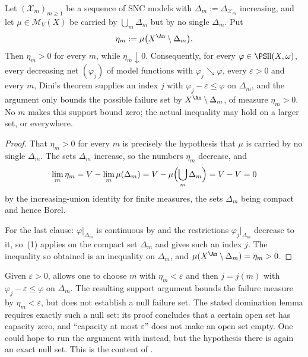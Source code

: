 \begin{proposition}
\label{prop:ch29-one-complex}
Let $(\mathcal X_m)_{m\geq1}$ be a sequence of SNC models with
$\Delta_m:=\Delta_{\mathcal X_m}$ increasing, and let
$\mu\in\mathcal M_V(X)$ be carried by
$\bigcup_m\Delta_m$ but by no single $\Delta_m$.  Put
\[
 \eta_m:=\mu\bigl(X^{\An}\setminus\Delta_m\bigr).
\]
Then $\eta_m>0$ for every $m$, while $\eta_m\downarrow0$.
Consequently, for every $\varphi\in\PSH(X,\omega)$, every decreasing net
$(\varphi_j)$ of model functions with $\varphi_j\searrow\varphi$, every
$\varepsilon>0$ and every $m$, Dini's theorem supplies an index
$j$ with $\varphi_j-\varepsilon\leq\varphi$ on $\Delta_m$, and the
argument only bounds the possible failure set by
$X^{\An}\setminus\Delta_m$, of measure $\eta_m>0$.
No $m$ makes this support bound zero; the actual inequality may hold
on a larger set, or everywhere.
\end{proposition}

\begin{proof}
That $\eta_m>0$ for every $m$ is precisely the hypothesis that $\mu$
is carried by no single $\Delta_m$.  The sets $\Delta_m$ increase, so
the numbers $\eta_m$ decrease, and
\[
 \lim_m\eta_m=V-\lim_m\mu(\Delta_m)
  =V-\mu\Bigl(\bigcup_m\Delta_m\Bigr)=V-V=0
\]
by the increasing-union identity for finite measures, the sets
$\Delta_m$ being compact and hence Borel.

For the last clause: $\varphi|_{\Delta_m}$ is continuous by
 and the restrictions
$\varphi_j|_{\Delta_m}$ decrease to it, so
\,(1) applies on the compact set $\Delta_m$ and gives
such an index $j$.  The inequality so obtained is an inequality on
$\Delta_m$, and $\mu(X^{\An}\setminus\Delta_m)=\eta_m>0$.
\end{proof}

\begin{remark}
\label{rem:ch29-no-diagonal}
Given $\varepsilon>0$,  allows one to choose
$m$ with $\eta_m<\varepsilon$ and then $j=j(m)$ with
$\varphi_j-\varepsilon\leq\varphi$ on $\Delta_m$.  The resulting
support argument bounds the failure measure by
$\eta_m<\varepsilon$, but does not establish a null failure set.
The stated domination lemma 
requires exactly such a null set: its proof concludes that a certain open set has
capacity zero, and ``capacity at most $\varepsilon$'' does not make an
open set empty.  One could hope to run the argument with
 instead, but the hypothesis there is
again an exact null set.  This is the content of
.
\end{remark}

